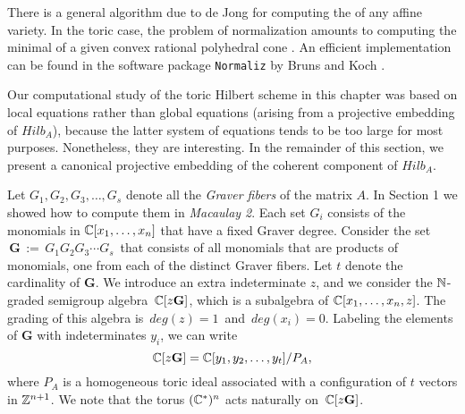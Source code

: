 There is a general algorithm due to de Jong \cite{HS:DJ} for 
computing the  of any affine variety. 
In the toric case, the problem of normalization amounts to  
computing the minimal {\em {}} of a given convex
rational polyhedral cone \cite{HS:Sch}. An efficient implementation can be 
found in the software package {\tt Normaliz} by Bruns and
Koch \cite{HS:BK}.

Our computational study of the toric Hilbert scheme in this
chapter was based on local equations rather than
global equations (arising from a projective embedding of  $Hilb_A$),
because the latter system of equations tends to be too large 
for most purposes. Nonetheless, they are interesting.
In the remainder of this section, we present a canonical 
projective embedding of the coherent component of $Hilb_A$.

Let $G_1, G_2, G_3, \ldots, G_s$ denote all the {\it Graver fibers} of
the matrix $A$. In Section 1 we showed how to compute them in 
{\sl Macaulay 2}. Each
set $G_i$ consists of the monomials in $\mathbb{C}[x_1,\ldots,x_n]$ 
that have a fixed Graver degree.  Consider the set $\, {\mathbf G} \,
:= \, G_1 G_2 G_3 \cdots G_s \,$ that consists of all monomials that
are products of monomials, one from each of the distinct Graver
fibers. Let $t$ denote the cardinality of ${\mathbf G}$.  We introduce
an extra indeterminate $z$, and we consider the $\mathbb{N}$-graded semigroup
algebra $\,\mathbb{C}[z {\mathbf G}] $, which is a subalgebra of
$\mathbb{C}[x_1,\ldots,x_n,z]$. The grading of this algebra is $\,deg(z) = 1\,$ and
$\, deg(x_i) = 0$. Labeling the elements of ${\mathbf G}$ with
indeterminates $y_i$, we can write
$$ \mathbb{C}[z {\mathbf G}]   = 
\mathbb{C}[y_1,y_2,\ldots,y_t]/P_A, $$
where $P_A$ is a homogeneous toric ideal
associated with a configuration of $t$ vectors in $\mathbb{Z}^{n+1}$.
We note that the torus $(\mathbb{C}^*)^n$ acts naturally on 
$\, \mathbb{C}[z {\mathbf G}]$.

